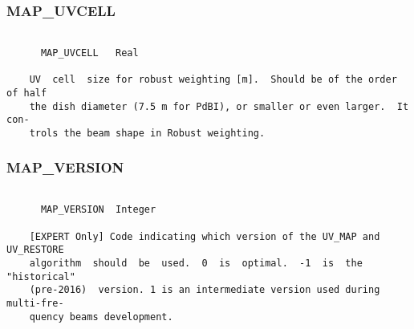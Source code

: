 \subsubsection{MAP\_UVCELL}
\begin{verbatim}

      MAP_UVCELL   Real

    UV  cell  size for robust weighting [m].  Should be of the order of half
    the dish diameter (7.5 m for PdBI), or smaller or even larger.  It  con-
    trols the beam shape in Robust weighting.

\end{verbatim}
\subsubsection{MAP\_VERSION}
\begin{verbatim}

      MAP_VERSION  Integer

    [EXPERT Only] Code indicating which version of the UV_MAP and UV_RESTORE
    algorithm  should  be  used.  0  is  optimal.  -1  is  the  "historical"
    (pre-2016)  version. 1 is an intermediate version used during multi-fre-
    quency beams development.



\end{verbatim}
